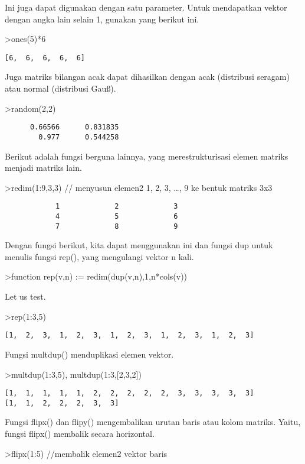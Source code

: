 \documentclass[
]{book}
\begin{document}
Ini juga dapat digunakan dengan satu parameter. Untuk mendapatkan vektor dengan angka lain selain 1, gunakan yang berikut ini.

\textgreater ones(5)*6

\begin{verbatim}
[6,  6,  6,  6,  6]
\end{verbatim}

Juga matriks bilangan acak dapat dihasilkan dengan acak (distribusi seragam) atau normal (distribusi Gauß).

\textgreater random(2,2)

\begin{verbatim}
      0.66566      0.831835 
        0.977      0.544258 
\end{verbatim}

Berikut adalah fungsi berguna lainnya, yang merestrukturisasi elemen matriks menjadi matriks lain.

\textgreater redim(1:9,3,3) // menyusun elemen2 1, 2, 3, \ldots, 9 ke bentuk matriks 3x3

\begin{verbatim}
            1             2             3 
            4             5             6 
            7             8             9 
\end{verbatim}

Dengan fungsi berikut, kita dapat menggunakan ini dan fungsi dup untuk menulis fungsi rep(), yang mengulangi vektor n kali.

\textgreater function rep(v,n) := redim(dup(v,n),1,n*cols(v))

Let us test.

\textgreater rep(1:3,5)

\begin{verbatim}
[1,  2,  3,  1,  2,  3,  1,  2,  3,  1,  2,  3,  1,  2,  3]
\end{verbatim}

Fungsi multdup() menduplikasi elemen vektor.

\textgreater multdup(1:3,5), multdup(1:3,{[}2,3,2{]})

\begin{verbatim}
[1,  1,  1,  1,  1,  2,  2,  2,  2,  2,  3,  3,  3,  3,  3]
[1,  1,  2,  2,  2,  3,  3]
\end{verbatim}

Fungsi flipx() dan flipy() mengembalikan urutan baris atau kolom matriks. Yaitu, fungsi flipx() membalik secara horizontal.

\textgreater flipx(1:5) //membalik elemen2 vektor baris
\end{document}
